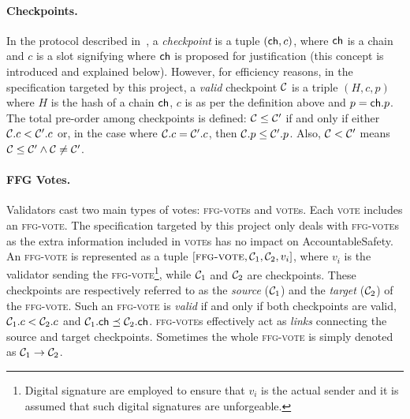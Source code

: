 \paragraph{Checkpoints.}
In the protocol described in~\cite{d20243}, a \emph{checkpoint} is a tuple $(\mathsf{ch}, c)$, where \(\mathsf{ch} \) is a chain and \( c \) is a slot signifying where \( \mathsf{ch} \) is proposed for justification (this concept is introduced and explained below).
However, for efficiency reasons, in the specification targeted by this project, a \emph{valid} checkpoint $\mathcal{C}$ is a triple $(H, c, p)$ where $H$ is the hash of a chain $\mathsf{ch}$, $c$ is as per the definition above and $p =  \mathsf{ch}.p$.
The total pre-order among checkpoints is defined:
$\mathcal{C} \leq \mathcal{C}'$ if and only if either \(\mathcal{C}.c < \mathcal{C}'.c\) or, in the case where \(\mathcal{C}.c = \mathcal{C}'.c\), then \(\mathcal{C}.p \leq \mathcal{C}'.p\). 
Also, $\mathcal{C} < \mathcal{C}'$ means $\mathcal{C} \leq \mathcal{C}' \land \mathcal{C} \neq \mathcal{C}'$.


\paragraph*{FFG Votes.}
Validators cast two main types of votes: \textsc{ffg-vote}s and \textsc{vote}s. 
Each \textsc{vote} includes an \textsc{ffg-vote}.
The specification targeted by this project only deals with \textsc{ffg-vote}s as the extra information included in  \textsc{vote}s has no impact on AccountableSafety.
An \textsc{ffg-vote} is represented as a tuple \([\textsc{ffg-vote}, \mathcal{C}_1, \mathcal{C}_2, v_i]\), where {$v_i$ is the validator sending the \textsc{ffg-vote}\footnote{Digital signature are employed to ensure that $v_i$ is the actual sender and it is assumed that such digital signatures are unforgeable.}, while} \(\mathcal{C}_1\) and \(\mathcal{C}_2\) are checkpoints.
These checkpoints are respectively referred to as the \emph{source} (\(\mathcal{C}_1\)) and the \emph{target} (\(\mathcal{C}_2\)) of the \textsc{ffg-vote}.
Such an \textsc{ffg-vote} is \emph{valid}
if and only if both checkpoints are valid, 
\(\mathcal{C}_1.c < \mathcal{C}_2.c\) and  \(\mathcal{C}_1.\mathsf{ch} \preceq \mathcal{C}_2.\mathsf{ch}\). 
\textsc{ffg-vote}s effectively act as \emph{links} connecting the source and target checkpoints. Sometimes the whole \textsc{ffg-vote} is simply denoted as \(\mathcal{C}_1 \to \mathcal{C}_2\).

